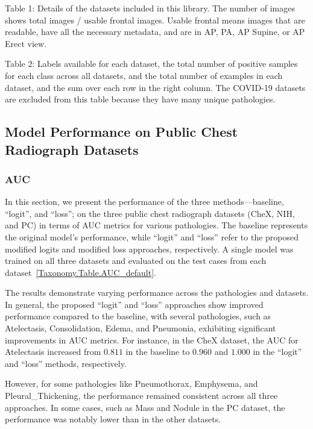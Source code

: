 Table 1: Details of the datasets included in this library. The number of images shows total images / usable frontal images. Usable frontal means images that are readable, have all the necessary metadata, and are in AP, PA, AP Supine, or AP Erect view.


Table 2: Labels available for each dataset, the total number of positive samples for each class across all datasets, and the total number of examples in each dataset, and the sum over each row in the right column. The COVID-19 datasets are excluded from this table because they have many unique pathologies.


\subsection{Model Performance on Public Chest Radiograph Datasets}

\subsubsection*{AUC}
In this section, we present the performance of the three methods—baseline, ``logit'', and ``loss''; on the three public chest radiograph datasets (CheX, NIH, and PC) in terms of AUC metrics for various pathologies. The baseline represents the original model's performance, while ``logit'' and ``loss'' refer to the proposed modified logits and modified loss approaches, respectively. A single model was trained on all three datasets and evaluated on the test cases from each dataset~\ref{Taxonomy.Table.AUC_default}.

The results demonstrate varying performance across the pathologies and datasets. In general, the proposed ``logit'' and ``loss'' approaches show improved performance compared to the baseline, with several pathologies, such as Atelectasis, Consolidation, Edema, and Pneumonia, exhibiting significant improvements in AUC metrics. For instance, in the CheX dataset, the AUC for Atelectasis increased from $0.811$ in the baseline to $0.960$ and $1.000$ in the ``logit'' and ``loss'' methods, respectively.

However, for some pathologies like Pneumothorax, Emphysema, and Pleural\_Thickening, the performance remained consistent across all three approaches. In some cases, such as Mass and Nodule in the PC dataset, the performance was notably lower than in the other datasets.


